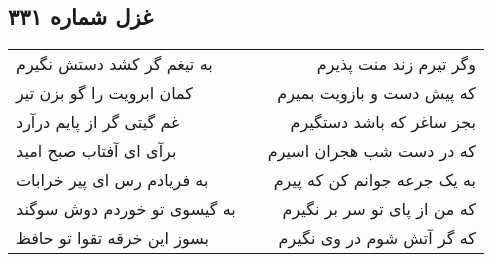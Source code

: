 \begin{center}
\section*{غزل شماره ۳۳۱}
\label{sec:sh331}
\begin{longtable}{l p{0.5cm} r}
به تیغم گر کشد دستش نگیرم
&&
وگر تیرم زند منت پذیرم
\\
کمان ابرویت را گو بزن تیر
&&
که پیش دست و بازویت بمیرم
\\
غم گیتی گر از پایم درآرد
&&
بجز ساغر که باشد دستگیرم
\\
برآی ای آفتاب صبح امید
&&
که در دست شب هجران اسیرم
\\
به فریادم رس ای پیر خرابات
&&
به یک جرعه جوانم کن که پیرم
\\
به گیسوی تو خوردم دوش سوگند
&&
که من از پای تو سر بر نگیرم
\\
بسوز این خرقه تقوا تو حافظ
&&
که گر آتش شوم در وی نگیرم
\\
\end{longtable}
\end{center}
